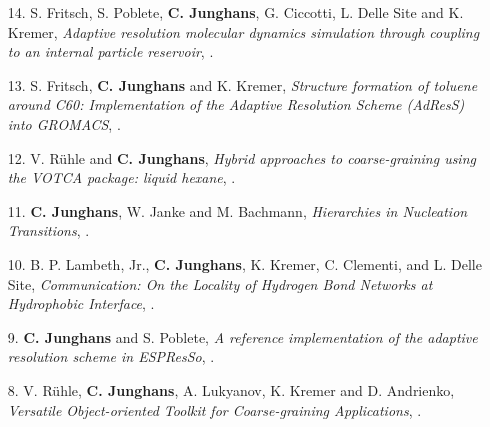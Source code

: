 \documentclass{article}
\begin{document}
\begin{enumerate}
\item[14.] S. Fritsch, S. Poblete, \textbf{C. Junghans}, G. Ciccotti, L. Delle Site and K. Kremer,
  \textit{Adaptive resolution molecular dynamics simulation through coupling to an internal particle reservoir},
  .

\item[13.] S. Fritsch, \textbf{C. Junghans} and K. Kremer,
  \textit{Structure formation of toluene around C60: Implementation of the Adaptive Resolution Scheme (AdResS) into GROMACS},
  .

\item[12.] V. R{\"u}hle and \textbf{C. Junghans},
  \textit{Hybrid approaches to coarse-graining using the VOTCA package: liquid hexane},
  .

\item[11.] \textbf{C. Junghans}, W. Janke and M. Bachmann,
  \textit{Hierarchies in Nucleation Transitions},
  .

\item[10.] B. P. Lambeth, Jr., \textbf{C. Junghans}, K. Kremer, C. Clementi, and L. Delle Site, 
  \textit{Communication: On the Locality of Hydrogen Bond Networks at Hydrophobic Interface},
  .

\item[9.] \textbf{C. Junghans} and S. Poblete,
  \textit{A reference implementation of the adaptive resolution scheme in ESPResSo},
  .

\item[8.] V. R{\"u}hle, \textbf{C. Junghans}, A. Lukyanov, K. Kremer and D. Andrienko,
  \textit{Versatile Object-oriented Toolkit for Coarse-graining Applications},
  . 


\end{enumerate}
\end{document}
